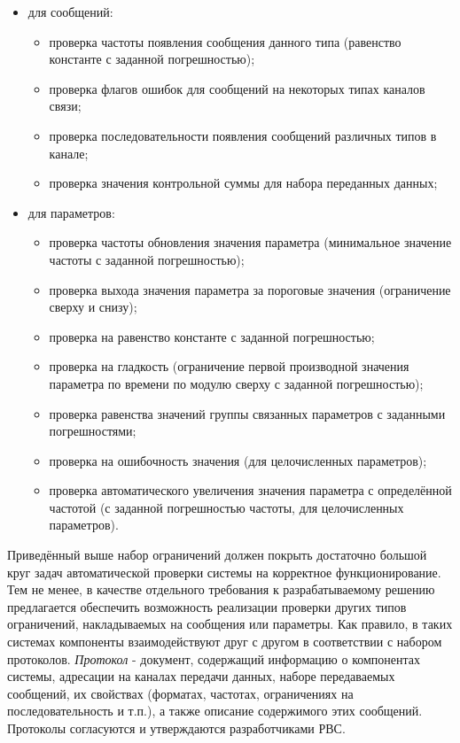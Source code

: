 \begin{itemize}
 \item для сообщений:
 \begin{itemize}
  \item проверка частоты появления сообщения данного типа (равенство константе 
с заданной погрешностью);
  \item проверка флагов ошибок для сообщений на некоторых типах каналов связи;
  \item проверка последовательности появления сообщений различных типов в 
канале;
  \item проверка значения контрольной суммы для набора переданных данных;
 \end{itemize}
 \item для параметров:
 \begin{itemize}
  \item проверка частоты обновления значения параметра (минимальное значение 
частоты с заданной погрешностью);
  \item проверка выхода значения параметра за пороговые значения (ограничение 
сверху и снизу);
  \item проверка на равенство константе с заданной погрешностью;
  \item проверка на гладкость (ограничение первой производной значения 
параметра по времени по модулю сверху с заданной погрешностью);
  \item проверка равенства значений группы связанных параметров с заданными 
погрешностями;
  \item проверка на ошибочность значения (для целочисленных параметров);
  \item проверка автоматического увеличения значения параметра с определённой 
частотой (с заданной погрешностью частоты, для целочисленных параметров).
 \end{itemize}
\end{itemize}

Приведённый выше набор ограничений должен покрыть достаточно большой круг задач 
автоматической проверки системы на корректное функционирование. Тем не менее, 
в качестве отдельного требования к разрабатываемому решению предлагается 
обеспечить возможность реализации проверки других типов ограничений, 
накладываемых на сообщения или параметры.
\iffalse
Как правило, в таких системах компоненты взаимодействуют друг с другом в 
соответствии с набором протоколов. \textit{Протокол} - документ, содержащий 
информацию о компонентах системы, адресации на каналах передачи данных, наборе 
передаваемых сообщений, их свойствах (форматах, частотах, ограничениях на 
последовательность и т.п.), а также описание содержимого этих сообщений. 
Протоколы согласуются и утверждаются разработчиками РВС.

